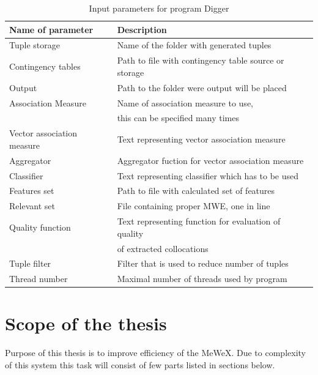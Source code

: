 \begin{table}[t]
    \centering
    \begin{tabular*}{0.9\textwidth}{|l @{\extracolsep{\fill}} l|}
        \hline 
        \textbf{Name of parameter} & \textbf{Description} \\
        \hline
        Tuple storage & Name of the folder with generated tuples \\
        \hline
        Contingency tables & Path to file with contingency table source or storage \\
        \hline
        Output & Path to the folder were output will be placed \\
        \hline
        Association Measure & Name of association measure to use, \\& this can be specified many times \\
        \hline
        Vector association measure & Text representing vector association measure \\
        \hline
        Aggregator & Aggregator fuction for vector association measure \\
        \hline
        Classifier & Text representing classifier which has to be used \\
        \hline
        Features set & Path to file with calculated set of features \\
        \hline
        Relevant set & File containing proper MWE, one in line \\
        \hline
        Quality function & Text representing function for evaluation of quality \\& of extracted collocations \\
        \hline
        Tuple filter & Filter that is used to reduce number of tuples \\
        \hline
        Thread number & Maximal number of threads used by program \\
        \hline
    \end{tabular*} 
    \caption{Input parameters for program Digger}
    \label{tbl_workflow2}
\end{table}

\section{Scope of the thesis}
Purpose of this thesis is to improve efficiency of the MeWeX. Due to complexity of this system this task 
will consist of few parts listed in sections below.

